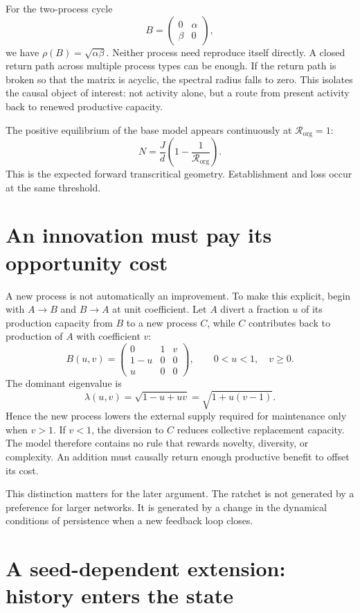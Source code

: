 \documentclass[11pt]{article}
\newcommand{\Rorg}{\mathcal R_{\mathrm{org}}}
\begin{document}
For the two-process cycle
\[
B=\begin{pmatrix}
0&\alpha\\
\beta&0
\end{pmatrix},
\]
we have $\rho(B)=\sqrt{\alpha\beta}$. Neither process need reproduce itself directly. A closed return path across multiple process types can be enough. If the return path is broken so that the matrix is acyclic, the spectral radius falls to zero. This isolates the causal object of interest: not activity alone, but a route from present activity back to renewed productive capacity.

The positive equilibrium of the base model appears continuously at $\Rorg=1$:
\[
N=\frac{J}{d}\left(1-\frac{1}{\Rorg}\right).
\]
This is the expected forward transcritical geometry. Establishment and loss occur at the same threshold.

\section{An innovation must pay its opportunity cost}

A new process is not automatically an improvement. To make this explicit, begin with $A\to B$ and $B\to A$ at unit coefficient. Let $A$ divert a fraction $u$ of its production capacity from $B$ to a new process $C$, while $C$ contributes back to production of $A$ with coefficient $v$:
\[
B(u,v)=
\begin{pmatrix}
0&1&v\\
1-u&0&0\\
u&0&0
\end{pmatrix},
\qquad 0<u<1,\quad v\ge 0.
\]
The dominant eigenvalue is
\[
\lambda(u,v)=\sqrt{1-u+uv}=\sqrt{1+u(v-1)}.
\]
Hence the new process lowers the external supply required for maintenance only when $v>1$. If $v<1$, the diversion to $C$ reduces collective replacement capacity. The model therefore contains no rule that rewards novelty, diversity, or complexity. An addition must causally return enough productive benefit to offset its cost.

This distinction matters for the later argument. The ratchet is not generated by a preference for larger networks. It is generated by a change in the dynamical conditions of persistence when a new feedback loop closes.

\section{A seed-dependent extension: history enters the state}
\end{document}
